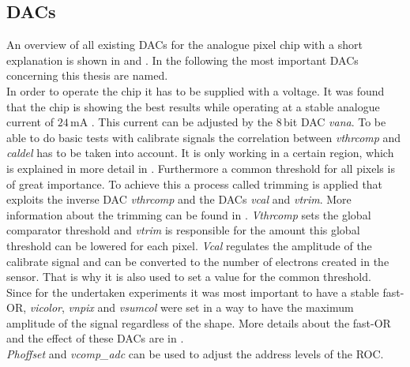 \subsection{\acs{DAC}s}\label{sdacs}
An overview of all existing \ac{DAC}s for the analogue pixel chip with a short explanation is shown in  and . In the following the most important \ac{DAC}s concerning this thesis are named.\\
In order to operate the chip it has to be supplied with a voltage. It was found that the chip is showing the best results while operating at a stable analogue current of $24\,$mA \cite{dambach}. This current can be adjusted by the $8\,$bit \ac{DAC} \textit{vana}. To be able to do basic tests with calibrate signals the correlation between \textit{vthrcomp} and \textit{caldel} has to be taken into account. It is only working in a certain region, which is explained in more detail in . Furthermore a common threshold for all pixels is of great importance. To achieve this a process called trimming is applied that exploits the inverse \ac{DAC} \textit{vthrcomp} and the \ac{DAC}s \textit{vcal} and \textit{vtrim}. More information about the trimming can be found in . \textit{Vthrcomp} sets the global comparator threshold and \textit{vtrim} is responsible for the amount this global threshold can be lowered for each pixel. \textit{Vcal} regulates the amplitude of the calibrate signal and can be converted to the number of electrons created in the sensor. That is why it is also used to set a value for the common threshold.\\
Since for the undertaken experiments it was most important to have a stable fast-OR, \textit{vicolor}, \textit{vnpix} and \textit{vsumcol} were set in a way to have the maximum amplitude of the signal regardless of the shape. More details about the fast-OR and the effect of these \ac{DAC}s are in .\\
\textit{Phoffset} and \textit{vcomp\_adc} can be used to adjust the address levels of the \ac{ROC}.

